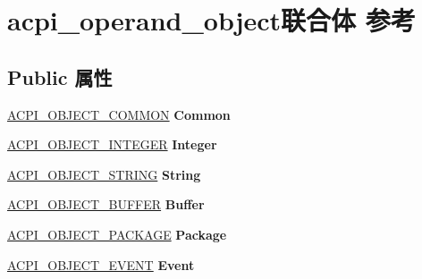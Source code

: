 \hypertarget{unionacpi__operand__object}{}\section{acpi\+\_\+operand\+\_\+object联合体 参考}
\label{unionacpi__operand__object}
\subsection*{Public 属性}
\begin{DoxyCompactItemize}
\item 
\mbox{\label{unionacpi__operand__object_abc919e5178090194537be7101885138c}} 
\hyperlink{structacpi__object__common}{A\+C\+P\+I\+\_\+\+O\+B\+J\+E\+C\+T\+\_\+\+C\+O\+M\+M\+ON} {\bfseries Common}
\item 
\mbox{\label{unionacpi__operand__object_a9e0aaa8f652a54f0b58498074e225334}} 
\hyperlink{structacpi__object__integer}{A\+C\+P\+I\+\_\+\+O\+B\+J\+E\+C\+T\+\_\+\+I\+N\+T\+E\+G\+ER} {\bfseries Integer}
\item 
\mbox{\label{unionacpi__operand__object_aed3d976138150d526d8f489c09d2008f}} 
\hyperlink{structacpi__object__string}{A\+C\+P\+I\+\_\+\+O\+B\+J\+E\+C\+T\+\_\+\+S\+T\+R\+I\+NG} {\bfseries String}
\item 
\mbox{\label{unionacpi__operand__object_af7ca32cf4956c998ca4b7886074d2876}} 
\hyperlink{structacpi__object__buffer}{A\+C\+P\+I\+\_\+\+O\+B\+J\+E\+C\+T\+\_\+\+B\+U\+F\+F\+ER} {\bfseries Buffer}
\item 
\mbox{\label{unionacpi__operand__object_adddb46c90a97f867aeef7de9579d5534}} 
\hyperlink{structacpi__object__package}{A\+C\+P\+I\+\_\+\+O\+B\+J\+E\+C\+T\+\_\+\+P\+A\+C\+K\+A\+GE} {\bfseries Package}
\item 
\mbox{\label{unionacpi__operand__object_a1271eb0c130d875d8012379d3ec55cbc}} 
\hyperlink{structacpi__object__event}{A\+C\+P\+I\+\_\+\+O\+B\+J\+E\+C\+T\+\_\+\+E\+V\+E\+NT} {\bfseries Event}
\item 
\mbox{\label{unionacpi__operand__object_a29c877142a2814afdc5ea1a8007f2d61}} 

\end{DoxyCompactItemize}
